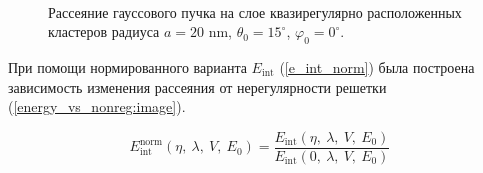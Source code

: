     \begin{figure}[H]

        \hfil
        \\
        \caption{Рассеяние гауссового пучка на слое квазирегулярно расположенных кластеров радиуса $a = 20$ nm, $\theta_0 = 15^{\circ}$, $\varphi_0 = 0^{\circ}$.}\label{nonreg_ka0.7:image}
    \end{figure}


При помощи нормированного варианта $E_{\textrm{int}}$ (\autoref{e_int_norm}) была построена зависимость изменения рассеяния от нерегулярности решетки (\autoref{energy_vs_nonreg:image}).

    \begin{equation}
        E_{\textrm{int}}^{\textrm{norm}} \left( \eta,\:\lambda, \:V, \:E_0 \right) = \frac{E_{\textrm{int}} \left( \eta,\:\lambda, \:V, \:E_0 \right)}{E_{\textrm{int}} \left( 0,\:\lambda, \:V, \:E_0 \right)}\label{e_int_norm}
    \end{equation}

